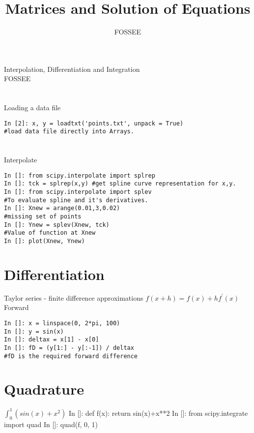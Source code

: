 \documentclass[12pt]{article}
\title{Matrices and Solution of Equations}
\author{FOSSEE}
\begin{document}
\date{}
\vspace{-1in}
\begin{center}
\LARGE{Interpolation, Differentiation and Integration}\\
\large{FOSSEE}
\end{center}
\section{}
Loading a data file
\begin{verbatim}
In [2]: x, y = loadtxt('points.txt', unpack = True)
#load data file directly into Arrays.
\end{verbatim}
\section{}
Interpolate
\begin{verbatim}
In []: from scipy.interpolate import splrep
In []: tck = splrep(x,y) #get spline curve representation for x,y.
In []: from scipy.interpolate import splev
#To evaluate spline and it's derivatives.
In []: Xnew = arange(0.01,3,0.02)
#missing set of points
In []: Ynew = splev(Xnew, tck)
#Value of function at Xnew
In []: plot(Xnew, Ynew)
\end{verbatim}

\section{Differentiation}
Taylor series - finite difference approximations
$f(x+h)=f(x)+hf^{'}(x)$ Forward
\begin{verbatim}
In []: x = linspace(0, 2*pi, 100)
In []: y = sin(x)
In []: deltax = x[1] - x[0]
In []: fD = (y[1:] - y[:-1]) / deltax 
#fD is the required forward difference
\end{verbatim}

\section{Quadrature}
$\int_0^1(sin(x) + x^2)$ 
In []: def f(x):
           return sin(x)+x**2
In []: from scipy.integrate import quad
In []: quad(f, 0, 1)
\end{document}

